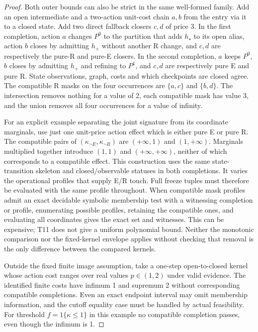 \begin{proof}
Both outer bounds can also be strict in the same well-formed family. Add an open intermediate and a two-action unit-cost chain \(a,b\) from the entry via it to a closed state. Add two direct fallback closers \(c,d\) of price 3. In the first completion, action \(a\) changes \(P^0\) to the partition that adds \(h_\star\) to its open alias, action \(b\) closes by admitting \(h_+\) without another R change, and \(c,d\) are respectively the pure-R and pure-E closers. In the second completion, \(a\) keeps \(P^0\), \(b\) closes by admitting \(h_+\) and refining to \(P^1\), and \(c,d\) are respectively pure E and pure R. State observations, graph, costs and which checkpoints are closed agree. The compatible R masks on the four occurrences are \(\{a,c\}\) and \(\{b,d\}\). The intersection removes nothing for a value of 2, each compatible mask has value 3, and the union removes all four occurrences for a value of infinity.

For an explicit example separating the joint signature from its coordinate marginals, use just one unit-price action effect which is either pure E or pure R. The compatible pairs of \((\kappa_{\neg E},\kappa_{\neg R})\) are \((+\infty,1)\) and \((1,+\infty)\). Marginals multiplied together introduce \((1,1)\) and \((+\infty,+\infty)\), neither of which corresponds to a compatible effect. This construction uses the same state-transition skeleton and closed/observable statuses in both completions. It varies the operational profiles that supply E/R touch. Full freeze tuples must therefore be evaluated with the same profile throughout. When compatible mask profiles admit an exact decidable symbolic membership test with a witnessing completion or profile, enumerating possible profiles, retaining the compatible ones, and evaluating all coordinates gives the exact set and witnesses. This can be expensive; T11 does not give a uniform polynomial bound. Neither the monotonic comparison nor the fixed-kernel envelope applies without checking that removal is the only difference between the compared kernels.

Outside the fixed finite image assumption, take a one-step open-to-closed kernel whose action cost ranges over real values \(p\in(1,2)\) under valid evidence. The identified finite costs have infimum 1 and supremum 2 without corresponding compatible completions. Even an exact endpoint interval may omit membership information, and the cutoff equality case must be handled by actual feasibility. For threshold \(f=1\{\kappa\le1\}\) in this example no compatible completion passes, even though the infimum is 1.

\end{proof}

